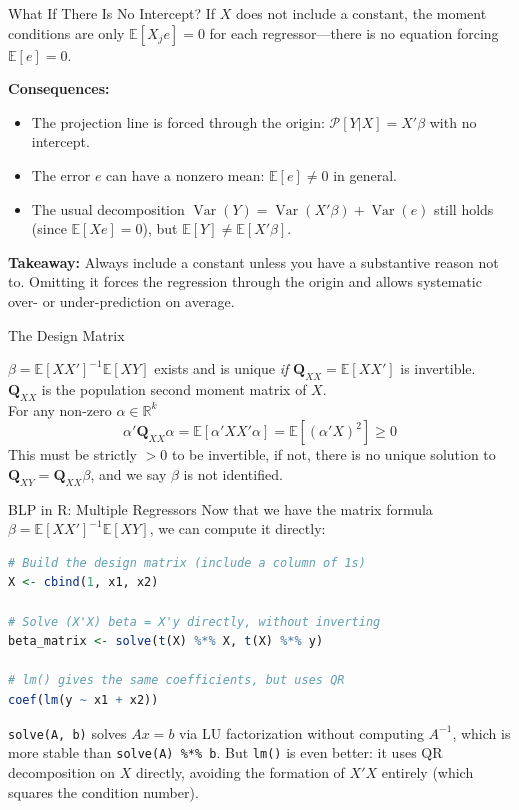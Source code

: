 \documentclass[aspectratio=169, handout, t]{beamer}
\numberwithin{equation}{section}
\begin{document}
\begin{frame}{What If There Is No Intercept?}
If $X$ does not include a constant, the moment conditions are only $\mathbb{E}[X_j e]=0$ for each regressor---there is no equation forcing $\mathbb{E}[e]=0$.
\pause

\medskip
\textbf{Consequences:}
\begin{itemize}
\item The projection line is forced through the origin: $\mathcal{P}[Y|X]=X'\beta$ with no intercept.
\item The error $e$ can have a nonzero mean: $\mathbb{E}[e]\neq 0$ in general.
\pause
\item The usual decomposition $\operatorname{Var}(Y)=\operatorname{Var}(X'\beta)+\operatorname{Var}(e)$ still holds (since $\mathbb{E}[Xe]=0$), but $\mathbb{E}[Y]\neq \mathbb{E}[X'\beta]$.
\end{itemize}
\pause
\medskip
\textbf{Takeaway:} Always include a constant unless you have a substantive reason not to.  Omitting it forces the regression through the origin and allows systematic over- or under-prediction on average.
\end{frame}

\begin{frame}{The Design Matrix}

$\beta = \mathbb{E}[XX']^{-1}\mathbb{E}[XY]$ exists and is unique \emph{if} $\mathbf{Q}_{XX}=\mathbb{E}[XX']$ is invertible.\\
\bigskip
$\mathbf{Q}_{XX}$ is the population second moment matrix of $X$.\\
\bigskip
For any non-zero $\alpha \in \mathbb{R}^k$
$$\alpha'\bm{Q}_{XX}\alpha=\mathbb{E}[\alpha'XX'\alpha]=\mathbb{E}[(\alpha'X)^2] \geq 0$$
This must be strictly $>0$ to be invertible, if not, there is no unique solution to $\mathbf{Q}_{XY}=\mathbf{Q}_{XX}\beta$, and we say $\beta$ is not identified.
\end{frame}


\begin{frame}[fragile]{BLP in R: Multiple Regressors}
Now that we have the matrix formula $\beta = \mathbb{E}[XX']^{-1}\mathbb{E}[XY]$, we can compute it directly:
\begin{lstlisting}[language=R]
# Build the design matrix (include a column of 1s)
X <- cbind(1, x1, x2)

# Solve (X'X) beta = X'y directly, without inverting
beta_matrix <- solve(t(X) %*% X, t(X) %*% y)

# lm() gives the same coefficients, but uses QR
coef(lm(y ~ x1 + x2))
\end{lstlisting}
\small
\texttt{solve(A, b)} solves $Ax=b$ via LU factorization without computing $A^{-1}$, which is more stable than \texttt{solve(A) \%*\% b}. But \texttt{lm()} is even better: it uses QR decomposition on $X$ directly, avoiding the formation of $X'X$ entirely (which squares the condition number).
\end{frame}
\end{document}
